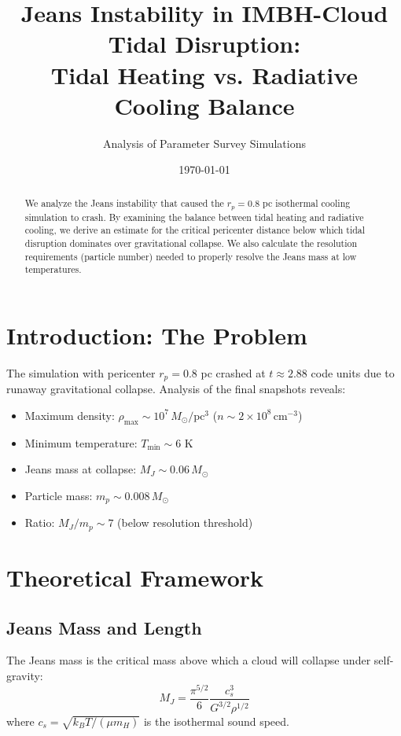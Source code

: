 \documentclass[12pt,a4paper]{article}
\title{Jeans Instability in IMBH-Cloud Tidal Disruption:\\
Tidal Heating vs. Radiative Cooling Balance}
\author{Analysis of Parameter Survey Simulations}
\date{\today}
\begin{document}
\maketitle

\begin{abstract}
We analyze the Jeans instability that caused the $r_p = 0.8$ pc isothermal cooling
simulation to crash. By examining the balance between tidal heating and radiative
cooling, we derive an estimate for the critical pericenter distance below which
tidal disruption dominates over gravitational collapse. We also calculate the
resolution requirements (particle number) needed to properly resolve the Jeans
mass at low temperatures.
\end{abstract}

\section{Introduction: The Problem}

The simulation with pericenter $r_p = 0.8$ pc crashed at $t \approx 2.88$ code units
due to runaway gravitational collapse. Analysis of the final snapshots reveals:
\begin{itemize}
    \item Maximum density: $\rho_{\max} \sim 10^7 \, M_\odot/\text{pc}^3$
          ($n \sim 2 \times 10^8 \, \text{cm}^{-3}$)
    \item Minimum temperature: $T_{\min} \sim 6$ K
    \item Jeans mass at collapse: $M_J \sim 0.06 \, M_\odot$
    \item Particle mass: $m_p \sim 0.008 \, M_\odot$
    \item Ratio: $M_J / m_p \sim 7$ (below resolution threshold)
\end{itemize}

\section{Theoretical Framework}

\subsection{Jeans Mass and Length}

The Jeans mass is the critical mass above which a cloud will collapse under
self-gravity:
\begin{equation}
    M_J = \frac{\pi^{5/2}}{6} \frac{c_s^3}{G^{3/2} \rho^{1/2}}
\end{equation}
where $c_s = \sqrt{k_B T / (\mu m_H)}$ is the isothermal sound speed.
\end{document}
